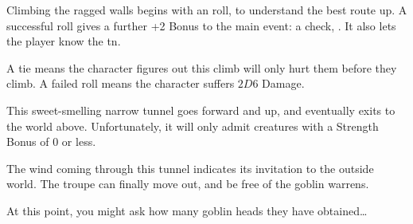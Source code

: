 \begin{multicols}{2}
Climbing the ragged walls begins with an  roll, to understand the best route up.
A successful roll gives a further +2 Bonus to the main event: a  check, \tn[14].
It also lets the player know the \gls{tn}.

A tie means the character figures out this climb will only hurt them before they climb.
A failed roll means the character suffers $2D6$ Damage.


This sweet-smelling narrow tunnel goes forward and up, and eventually exits to the world above.
Unfortunately, it will only admit creatures with a Strength Bonus of 0 or less.


The wind coming through this tunnel indicates its invitation to the outside world.
The troupe can finally move out, and be free of the goblin warrens.

At this point, you might ask how many goblin heads they have obtained\ldots

\end{multicols}
